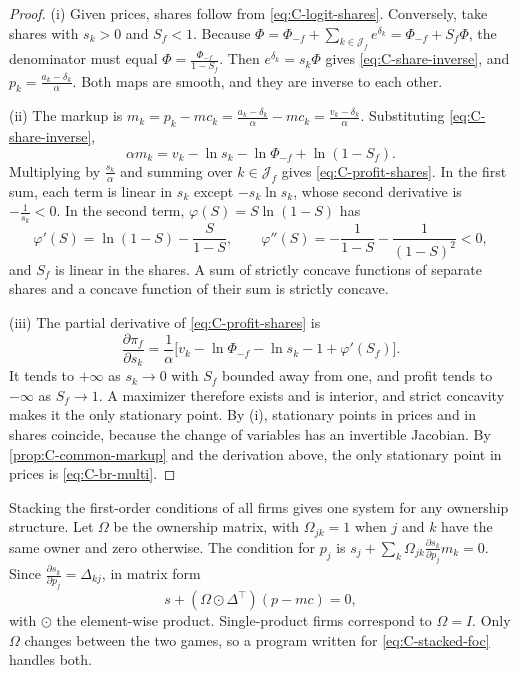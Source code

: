 \begin{proof}
(i) Given prices, shares follow from \eqref{eq:C-logit-shares}. Conversely, take shares with $s_k > 0$ and $S_f < 1$.
Because $\Phi = \Phi_{-f} + \sum_{k \in \mathcal{J}_f}e^{\delta_k} = \Phi_{-f} + S_f\Phi$, the denominator must equal
$\Phi = \frac{\Phi_{-f}}{1 - S_f}$. Then $e^{\delta_k} = s_k\Phi$ gives \eqref{eq:C-share-inverse}, and
$p_k = \frac{a_k - \delta_k}{\alpha}$. Both maps are smooth, and they are inverse to each other.

(ii) The markup is $m_k = p_k - mc_k = \frac{a_k - \delta_k}{\alpha} - mc_k = \frac{v_k - \delta_k}{\alpha}$.
Substituting \eqref{eq:C-share-inverse},
\begin{equation*}
  \alpha m_k = v_k - \ln s_k - \ln\Phi_{-f} + \ln(1 - S_f) .
\end{equation*}
Multiplying by $\frac{s_k}{\alpha}$ and summing over $k \in \mathcal{J}_f$ gives \eqref{eq:C-profit-shares}. In the first
sum, each term is linear in $s_k$ except $-s_k\ln s_k$, whose second derivative is $-\frac{1}{s_k} < 0$. In the second
term, $\varphi(S) = S\ln(1 - S)$ has
\begin{equation*}
  \varphi'(S) = \ln(1 - S) - \frac{S}{1 - S} , \qquad
  \varphi''(S) = -\frac{1}{1 - S} - \frac{1}{(1 - S)^2} < 0 ,
\end{equation*}
and $S_f$ is linear in the shares. A sum of strictly concave functions of separate shares and a concave function of
their sum is strictly concave.

(iii) The partial derivative of \eqref{eq:C-profit-shares} is
\begin{equation*}
  \frac{\partial\pi_f}{\partial s_k} = \frac{1}{\alpha}\big[v_k - \ln\Phi_{-f} - \ln s_k - 1 + \varphi'(S_f)\big] .
\end{equation*}
It tends to $+\infty$ as $s_k \to 0$ with $S_f$ bounded away from one, and profit tends to $-\infty$ as
$S_f \to 1$. A maximizer therefore exists and is interior, and strict concavity makes it the only stationary point.
By (i), stationary points in prices and in shares coincide, because the change of variables has an invertible
Jacobian. By \cref{prop:C-common-markup} and the derivation above, the only stationary point in prices is
\eqref{eq:C-br-multi}.
\end{proof}

Stacking the first-order conditions of all firms gives one system for any ownership structure. Let $\Omega$ be the
ownership matrix, with $\Omega_{jk} = 1$ when $j$ and $k$ have the same owner and zero otherwise. The condition
for $p_j$ is $s_j + \sum_k\Omega_{jk}\frac{\partial s_k}{\partial p_j}m_k = 0$. Since
$\frac{\partial s_k}{\partial p_j} = \Delta_{kj}$, in matrix form
\begin{equation}\label{eq:C-stacked-foc}
  s + (\Omega \odot \Delta^\top)(p - mc) = 0 ,
\end{equation}
with $\odot$ the element-wise product. Single-product firms correspond to $\Omega = I$. Only $\Omega$ changes between
the two games, so a program written for \eqref{eq:C-stacked-foc} handles both.

